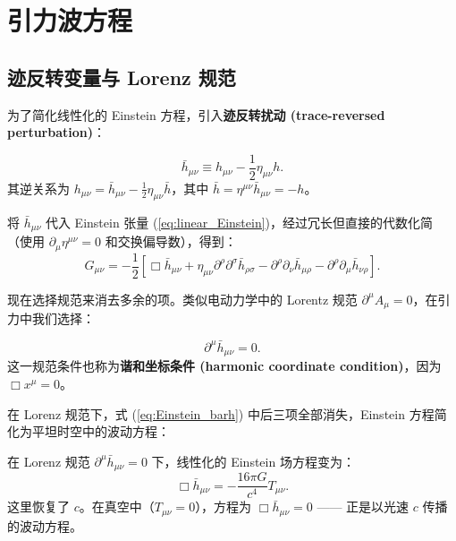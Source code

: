 \section{引力波方程}
\label{sec:GW_equation}

\subsection{迹反转变量与 Lorenz 规范}

为了简化线性化的 Einstein 方程，引入\textbf{迹反转扰动 (trace-reversed perturbation)}：

\begin{definition}[迹反转变量]
\begin{equation}
    \boxed{\bar{h}_{\mu\nu} \equiv h_{\mu\nu} - \frac{1}{2}\eta_{\mu\nu}h}.
    \label{eq:bar_h}
\end{equation}
其逆关系为 $h_{\mu\nu} = \bar{h}_{\mu\nu} - \frac{1}{2}\eta_{\mu\nu}\bar{h}$，其中 $\bar{h} = \eta^{\mu\nu}\bar{h}_{\mu\nu} = -h$。
\end{definition}

将 $\bar{h}_{\mu\nu}$ 代入 Einstein 张量 (\ref{eq:linear_Einstein})，经过冗长但直接的代数化简（使用 $\partial_\mu\eta^{\mu\nu}=0$ 和交换偏导数），得到：
\begin{equation}
    G_{\mu\nu} = -\frac{1}{2}\left[\Box \bar{h}_{\mu\nu} + \eta_{\mu\nu}\partial^\rho\partial^\sigma\bar{h}_{\rho\sigma} - \partial^\rho\partial_\nu\bar{h}_{\mu\rho} - \partial^\rho\partial_\mu\bar{h}_{\nu\rho}\right].
    \label{eq:Einstein_barh}
\end{equation}

现在选择规范来消去多余的项。类似电动力学中的 Lorentz 规范 $\partial^\mu A_\mu = 0$，在引力中我们选择：

\begin{definition}
\begin{equation}
    \boxed{\partial^\mu \bar{h}_{\mu\nu} = 0}.
    \label{eq:Lorenz_gauge}
\end{equation}
这一规范条件也称为\textbf{谐和坐标条件 (harmonic coordinate condition)}，因为 $\Box x^\mu = 0$。
\end{definition}

在 Lorenz 规范下，式 (\ref{eq:Einstein_barh}) 中后三项全部消失，Einstein 方程简化为平坦时空中的波动方程：

\begin{theorem}
在 Lorenz 规范 $\partial^\mu\bar{h}_{\mu\nu}=0$ 下，线性化的 Einstein 场方程变为：
\begin{equation}
    \boxed{\Box \bar{h}_{\mu\nu} = -\frac{16\pi G}{c^4} T_{\mu\nu}}.
    \label{eq:wave_equation}
\end{equation}
这里恢复了 $c$。在真空中（$T_{\mu\nu}=0$），方程为 $\Box\bar{h}_{\mu\nu} = 0$ —— 正是以光速 $c$ 传播的波动方程。
\end{theorem}

